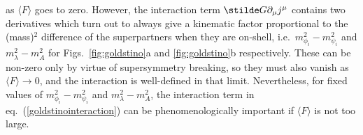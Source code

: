 as $\langle F \rangle$ goes to zero. However, the
interaction term $\stilde G \partial_\mu j^\mu$ contains two
derivatives which turn out to always
give a kinematic factor proportional to the (mass)$^2$ difference
of the superpartners when they are on-shell,
i.e.~$m_{\phi_i}^2 - m_{\psi_i}^2$
and $m^2_{\lambda} - m_{A}^2$ for Figs.~\ref{fig:goldstino}a and
\ref{fig:goldstino}b respectively. These
can be non-zero only
by virtue of supersymmetry breaking, so they must also vanish as $\langle
F\rangle \rightarrow 0$,
and the interaction is well-defined in that limit.
Nevertheless, for fixed values of $m_{\phi_i}^2 - m_{\psi_i}^2$
and $m^2_{\lambda} - m_{A}^2$, the interaction term in
eq.~(\ref{goldstinointeraction}) can be phenomenologically important
if $\langle F \rangle $ is not too 
large.\cite{Fayetsupercurrent,eeGMSBsignal,DDRT,AKKMM2}


